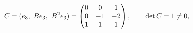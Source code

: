 \documentclass[preview]{standalone}
\begin{document}
\begin{align*}
\special{dvisvgm:raw <g id='unique000'>}C=(e_3,\ B e_3,\ B^2 e_3)=\begin{pmatrix}0&0&1\\0&-1&-2\\1&1&1\end{pmatrix},\qquad \det C=1\neq 0,\special{dvisvgm:raw </g>}
\end{align*}
\end{document}
